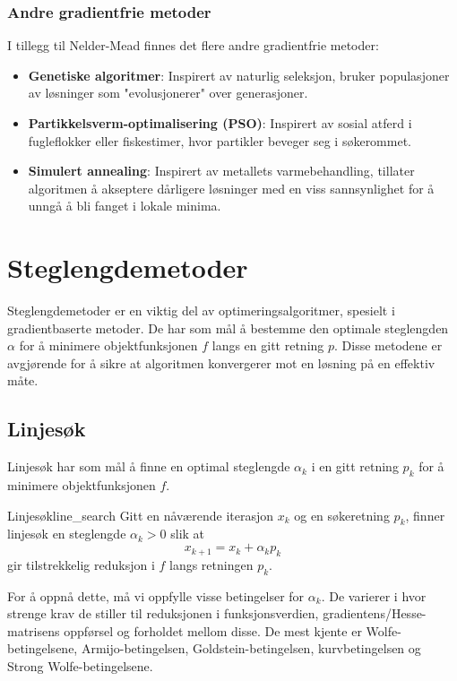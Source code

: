 \subsection{Andre gradientfrie metoder}

I tillegg til Nelder-Mead finnes det flere andre gradientfrie metoder:

\begin{itemize}
	\item \textbf{Genetiske algoritmer}: Inspirert av naturlig seleksjon, bruker populasjoner av løsninger som "evolusjonerer" over generasjoner.
	\item \textbf{Partikkelsverm-optimalisering (PSO)}: Inspirert av sosial atferd i fugleflokker eller fiskestimer, hvor partikler beveger seg i søkerommet.
	\item \textbf{Simulert annealing}: Inspirert av metallets varmebehandling, tillater algoritmen å akseptere dårligere løsninger med en viss sannsynlighet for å unngå å bli fanget i lokale minima.
\end{itemize}

\chapter{Steglengdemetoder}
\label{chap:step_length_methods}
Steglengdemetoder er en viktig del av optimeringsalgoritmer, spesielt i gradientbaserte metoder.
De har som mål å bestemme den optimale steglengden \(\alpha\) for å minimere objektfunksjonen \(f\) langs en gitt retning \(p\).
Disse metodene er avgjørende for å sikre at algoritmen konvergerer mot en løsning på en effektiv måte.

\section{Linjesøk}\label{sec:line_search}
Linjesøk har som mål å finne en optimal steglengde \(\alpha_k\) i en gitt retning \(p_k\) for å minimere objektfunksjonen \(f\).

\begin{definition}{Linjesøk}{line_search}
	Gitt en nåværende iterasjon \(x_k\) og en søkeretning \(p_k\), finner linjesøk en steglengde \(\alpha_k > 0\) slik at
	\[
		x_{k+1} = x_k + \alpha_k p_k
	\]
	gir tilstrekkelig reduksjon i \(f\) langs retningen \(p_k\).
\end{definition}

For å oppnå dette, må vi oppfylle visse betingelser for \(\alpha_k\).
De varierer i hvor strenge krav de stiller til reduksjonen i funksjonsverdien, gradientens/Hesse-matrisens oppførsel og forholdet mellom disse.
De mest kjente er Wolfe-betingelsene, Armijo-betingelsen, Goldstein-betingelsen, kurvbetingelsen og Strong Wolfe-betingelsene.

